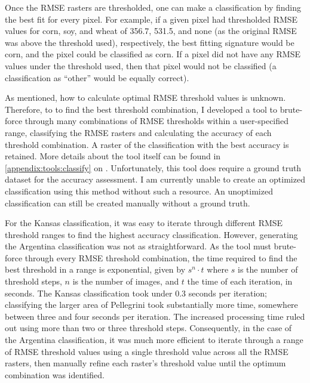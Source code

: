 Once the RMSE rasters are thresholded, one can make a classification by finding the best fit for every pixel. For example, if a given pixel had thresholded RMSE values for corn, soy, and wheat of 356.7, 531.5, and none (as the original RMSE was above the threshold used), respectively, the best fitting signature would be corn, and the pixel could be classified as corn. If a pixel did not have any RMSE values under the threshold used, then that pixel would not be classified (a classification as ``other'' would be equally correct).

As mentioned, how to calculate optimal RMSE threshold values is unknown. Therefore, to to find the best threshold combination, I developed a tool to brute-force through many combinations of RMSE thresholds within a user-specified range, classifying the RMSE rasters and calculating the accuracy of each threshold combination. A raster of the classification with the best accuracy is retained. More details about the tool itself can be found in \autoref{appendix:tools:classify} on . Unfortunately, this tool does require a ground truth dataset for the accuracy assessment. I am currently unable to create an optimized classification using this method without such a resource. An unoptimized classification can still be created manually without a ground truth.

For the Kansas classification, it was easy to iterate through different RMSE threshold ranges to find the highest accuracy classification. However, generating the Argentina classification was not as straightforward. As the tool must brute-force through every RMSE threshold combination, the time required to find the best threshold in a range is exponential, given by $s^n\cdot t$ where $s$ is the number of threshold steps, $n$ is the number of images, and $t$ the time of each iteration, in seconds. The Kansas classification took under 0.3 seconds per iteration; classifying the larger area of Pellegrini took substantially more time, somewhere between three and four seconds per iteration. The increased processing time ruled out using more than two or three threshold steps. Consequently, in the case of the Argentina classification, it was much more efficient to iterate through a range of RMSE threshold values using a single threshold value across all the RMSE rasters, then manually refine each raster's threshold value until the optimum combination was identified.